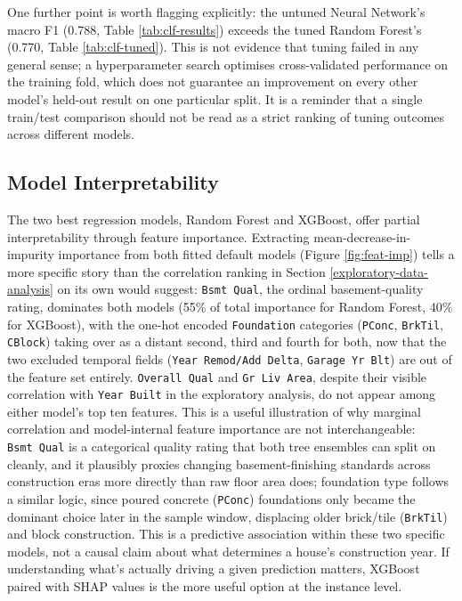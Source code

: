 \documentclass[11pt,a4paper]{article}
\begin{document}
One further point is worth flagging explicitly: the untuned Neural
Network's macro F1 (0.788, Table \ref{tab:clf-results}) exceeds the
tuned Random Forest's (0.770, Table \ref{tab:clf-tuned}). This is not
evidence that tuning failed in any general sense; a hyperparameter
search optimises cross-validated performance on the training fold, which
does not guarantee an improvement on every other model's held-out result
on one particular split. It is a reminder that a single train/test
comparison should not be read as a strict ranking of tuning outcomes
across different models.

\subsection{Model Interpretability}\label{model-interpretability}

The two best regression models, Random Forest and XGBoost, offer partial
interpretability through feature importance. Extracting
mean-decrease-in-impurity importance from both fitted default models
(Figure \ref{fig:feat-imp}) tells a more specific story than the
correlation ranking in Section \ref{exploratory-data-analysis} on its
own would suggest: \texttt{Bsmt\ Qual}, the ordinal basement-quality
rating, dominates both models (55\% of total importance for Random
Forest, 40\% for XGBoost), with the one-hot encoded \texttt{Foundation}
categories (\texttt{PConc}, \texttt{BrkTil}, \texttt{CBlock}) taking
over as a distant second, third and fourth for both, now that the two
excluded temporal fields (\texttt{Year\ Remod/Add\ Delta},
\texttt{Garage\ Yr\ Blt}) are out of the feature set entirely.
\texttt{Overall\ Qual} and \texttt{Gr\ Liv\ Area}, despite their visible
correlation with \texttt{Year\ Built} in the exploratory analysis, do
not appear among either model's top ten features. This is a useful
illustration of why marginal correlation and model-internal feature
importance are not interchangeable: \texttt{Bsmt\ Qual} is a categorical
quality rating that both tree ensembles can split on cleanly, and it
plausibly proxies changing basement-finishing standards across
construction eras more directly than raw floor area does; foundation
type follows a similar logic, since poured concrete (\texttt{PConc})
foundations only became the dominant choice later in the sample window,
displacing older brick/tile (\texttt{BrkTil}) and block construction.
This is a predictive association within these two specific models, not a
causal claim about what determines a house's construction year. If
understanding what's actually driving a given prediction matters,
XGBoost paired with SHAP values is the more useful option at the
instance level.
\end{document}
